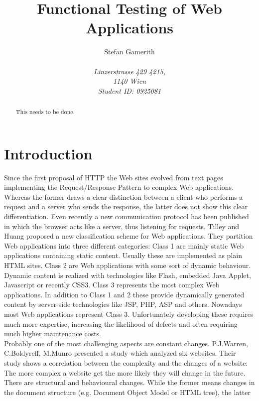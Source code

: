 \documentclass[12pt, notitlepage]{article}
\title{Functional Testing of Web Applications}
\author{Stefan Gamerith\\\\
		\emph{Linzerstrasse 429 4215,}\\
		\emph{1140 Wien}\\
		\emph{Student ID: 0925081}}
\begin{document}
	\maketitle
	\thispagestyle{empty}
	\begin{abstract}
		This needs to be done.
	\end{abstract}
	\newpage
	\thispagestyle{empty}
	\onehalfspacing
	\tableofcontents
	\singlespacing
\newpage
\setcounter{page}{1}

\section*{Introduction}
Since the first proposal of HTTP\cite{http-proposal} the Web sites evolved from 
text pages implementing the Request/Response Pattern\cite{request-response}  to  
complex Web applications. Whereas the former draws a clear distinction between a client
who performs a request and a server who sends the response, the latter does not show this 
clear differentiation. Even recently a new communication protocol\cite{web-socket} has been published 
in which the browser acts like a server, thus listening for requests. Tilley and Huang \cite{web-classification} proposed
a new classification scheme for Web applications. They partition Web applications into three different categories:
Class 1 are mainly static Web applications containing static content. Usually these are implemented as plain HTML sites. 
Class 2 are Web applications with some sort of dynamic behaviour. Dynamic content is realized with technologies like Flash\cite{flash},
embedded Java Applet\cite{java-applet}, Javascript or recently CSS3\cite{css3}. 
Class 3 represents the most complex Web applications. In addition to Class 1 and 2 these provide dynamically generated content by server-side technologies
like JSP, PHP, ASP and others. Nowadays most Web applications represent Class 3. Unfortunately developing these requires much more expertise, increasing the
likelihood of defects and often requiring much higher maintenance costs.\\
Probably one of the most challenging aspects are constant changes. P.J.Warren, C.Boldyreff, M.Munro\cite{html-evolution}
presented a study which analyzed six websites. Their study shows a correlation between the complexity and the changes of
a website: The more complex a website get the more likely they will change in the future. 
There are structural and behavioural changes. While the former means changes in the document structure (e.g. Document Object Model\cite{dom} or HTML tree), the latter
\end{document}
